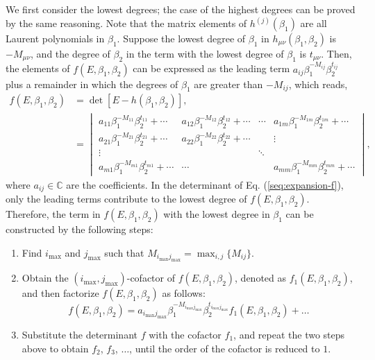 \documentclass[pdflatex,sn-nature, iicol]{sn-jnl}%
\theoremstyle{thmstyleone}%
\theoremstyle{thmstyletwo}%
\theoremstyle{thmstylethree}%
\begin{document}
We first consider the lowest degrees; the case of the highest degrees
can be proved by the same reasoning. Note that the matrix elements
of $h^{(j)}(\beta_{1})$ are all Laurent polynomials in $\beta_{1}$.
Suppose the lowest degree of $\beta_{1}$ in $h_{\mu\nu}(\beta_{1},\beta_{2})$
is $-M_{\mu\nu}$, and the degree of $\beta_{2}$ in the term with
the lowest degree of $\beta_{1}$ is $t_{\mu\nu}$. Then, the elements
of $f(E,\beta_{1},\beta_{2})$ can be expressed as the leading term
$a_{ij}\beta_{1}^{-M_{ij}}\beta_{2}^{t_{ij}}$ plus a remainder in
which the degrees of $\beta_{1}$ are greater than $-M_{ij}$, which
reads, 
\begin{align}
f\left(E,\beta_{1},\beta_{2}\right) & =\det\left[E-h\left(\beta_{1},\beta_{2}\right)\right],\nonumber \\
 & =\begin{vmatrix}a_{11}\beta_{1}^{-M_{11}}\beta_{2}^{t_{11}}+\cdots & a_{12}\beta_{1}^{-M_{12}}\beta_{2}^{t_{12}}+\cdots & \cdots & a_{1m}\beta_{1}^{-M_{1m}}\beta_{2}^{t_{1m}}+\cdots\\
a_{21}\beta_{1}^{-M_{21}}\beta_{2}^{t_{21}}+\cdots & a_{22}\beta_{1}^{-M_{22}}\beta_{2}^{t_{22}}+\cdots &  & \vdots\\
\vdots &  & \ddots\\
a_{m1}\beta_{1}^{-M_{m1}}\beta_{2}^{t_{m1}}+\cdots & \cdots &  & a_{mm}\beta_{1}^{-M_{mm}}\beta_{2}^{t_{mm}}+\cdots
\end{vmatrix},\label{seq:expansion-f}
\end{align}
where $a_{ij}\in\mathbb{C}$ are the coefficients. In the determinant
of Eq. (\ref{seq:expansion-f}), only the leading terms contribute
to the lowest degree of $f(E,\beta_{1},\beta_{2})$. Therefore, the
term in $f(E,\beta_{1},\beta_{2})$ with the lowest degree in $\beta_{1}$
can be constructed by the following steps: 
\begin{enumerate}
\item Find $i_{\max}$ and $j_{\max}$ such that $M_{i_{\max}j_{\max}}=\max_{i,j}\{M_{ij}\}$. 
\item Obtain the $(i_{\max},j_{\max})$-cofactor of $f(E,\beta_{1},\beta_{2})$,
denoted as $f_{1}(E,\beta_{1},\beta_{2})$, and then factorize $f(E,\beta_{1},\beta_{2})$
as follows: 
\begin{equation}
f\left(E,\beta_{1},\beta_{2}\right)=a_{i_{\max}j_{\max}}\beta_{1}^{-M_{i_{\max}j_{\max}}}\beta_{2}^{t_{i_{\max}j_{\max}}}f_{1}\left(E,\beta_{1},\beta_{2}\right)+\dots
\end{equation}
\item Substitute the determinant $f$ with the cofactor $f_{1}$, and repeat
the two steps above to obtain $f_{2}$, $f_{3}$, $\dots$, until
the order of the cofactor is reduced to $1$. 
\end{enumerate}
\end{document}
